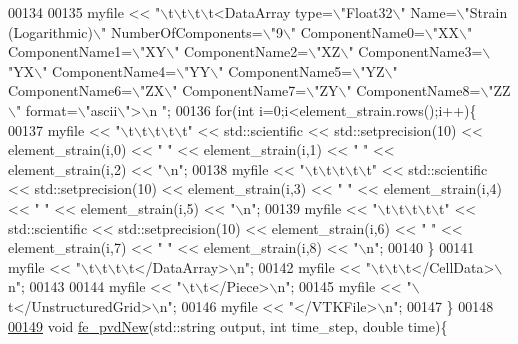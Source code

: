 \begin{DoxyCode}
00134 
00135     myfile << \textcolor{stringliteral}{"\(\backslash\)t\(\backslash\)t\(\backslash\)t\(\backslash\)t<DataArray type=\(\backslash\)"Float32\(\backslash\)" Name=\(\backslash\)"Strain (Logarithmic)\(\backslash\)" NumberOfComponents=\(\backslash\)"9\(\backslash\)"
       ComponentName0=\(\backslash\)"XX\(\backslash\)" ComponentName1=\(\backslash\)"XY\(\backslash\)" ComponentName2=\(\backslash\)"XZ\(\backslash\)" ComponentName3=\(\backslash\)"YX\(\backslash\)" ComponentName4=\(\backslash\)"YY\(\backslash\)"
       ComponentName5=\(\backslash\)"YZ\(\backslash\)" ComponentName6=\(\backslash\)"ZX\(\backslash\)" ComponentName7=\(\backslash\)"ZY\(\backslash\)" ComponentName8=\(\backslash\)"ZZ\(\backslash\)" format=\(\backslash\)"ascii\(\backslash\)">\(\backslash\)n
      "};
00136     \textcolor{keywordflow}{for}(\textcolor{keywordtype}{int} i=0;i<element\_strain.rows();i++)\{
00137             myfile << \textcolor{stringliteral}{"\(\backslash\)t\(\backslash\)t\(\backslash\)t\(\backslash\)t\(\backslash\)t"} << std::scientific << std::setprecision(10) << element\_strain(i,0) << \textcolor{stringliteral}{" 
      "} << element\_strain(i,1) << \textcolor{stringliteral}{" "} << element\_strain(i,2) << \textcolor{stringliteral}{"\(\backslash\)n"};
00138             myfile << \textcolor{stringliteral}{"\(\backslash\)t\(\backslash\)t\(\backslash\)t\(\backslash\)t\(\backslash\)t"} << std::scientific << std::setprecision(10) << element\_strain(i,3) << \textcolor{stringliteral}{" 
      "} << element\_strain(i,4) << \textcolor{stringliteral}{" "} << element\_strain(i,5) << \textcolor{stringliteral}{"\(\backslash\)n"};
00139             myfile << \textcolor{stringliteral}{"\(\backslash\)t\(\backslash\)t\(\backslash\)t\(\backslash\)t\(\backslash\)t"} << std::scientific << std::setprecision(10) << element\_strain(i,6) << \textcolor{stringliteral}{" 
      "} << element\_strain(i,7) << \textcolor{stringliteral}{" "} << element\_strain(i,8) << \textcolor{stringliteral}{"\(\backslash\)n"};
00140     \}
00141     myfile << \textcolor{stringliteral}{"\(\backslash\)t\(\backslash\)t\(\backslash\)t\(\backslash\)t</DataArray>\(\backslash\)n"};
00142     myfile << \textcolor{stringliteral}{"\(\backslash\)t\(\backslash\)t\(\backslash\)t</CellData>\(\backslash\)n"};
00143 
00144     myfile << \textcolor{stringliteral}{"\(\backslash\)t\(\backslash\)t</Piece>\(\backslash\)n"};
00145     myfile << \textcolor{stringliteral}{"\(\backslash\)t</UnstructuredGrid>\(\backslash\)n"};
00146     myfile << \textcolor{stringliteral}{"</VTKFile>\(\backslash\)n"};
00147 \}
00148 
\hyperlink{fe__vtu_8cpp_aedbf95dc6f02a506b606328037cd58e1}{00149} \textcolor{keywordtype}{void} \hyperlink{fe__vtu_8cpp_aedbf95dc6f02a506b606328037cd58e1}{fe\_pvdNew}(std::string output, \textcolor{keywordtype}{int} time\_step, \textcolor{keywordtype}{double} time)\{

\end{DoxyCode}
